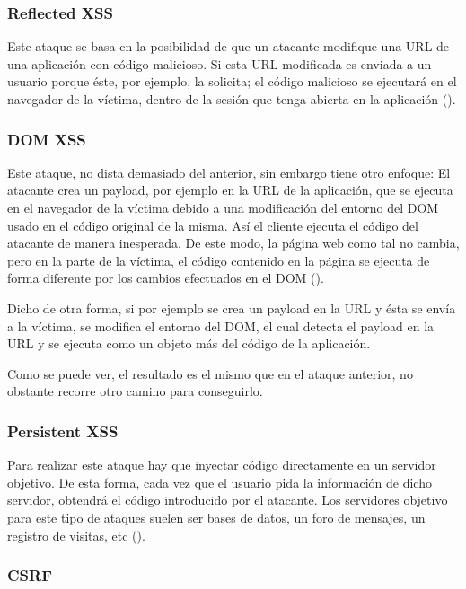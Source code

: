 \subsubsection{Reflected XSS}

Este ataque se basa en la posibilidad de que un atacante modifique una URL de una aplicación con código malicioso. Si esta URL modificada es enviada a un usuario porque éste, por ejemplo, la solicita; el código malicioso se ejecutará en el navegador de la víctima, dentro de la sesión que tenga abierta en la aplicación (\cite{reflected-xss}). %

\subsubsection{DOM XSS}

Este ataque, no dista demasiado del anterior, sin embargo tiene otro enfoque: El atacante crea un payload, por ejemplo en la URL de la aplicación, que se ejecuta en el navegador de la víctima debido a una modificación del entorno del DOM usado en el código original de la misma. Así el cliente ejecuta el código del atacante de manera inesperada. De este modo, la página web como tal no cambia, pero en la parte de la víctima, el código contenido en la página se ejecuta de forma diferente por los cambios efectuados en el DOM (\cite{dom-xss}).

Dicho de otra forma, si por ejemplo se crea un payload en la URL y ésta se envía a la víctima, se modifica el entorno del DOM, el cual detecta el payload en la URL y se ejecuta como un objeto más del código de la aplicación.

Como se puede ver, el resultado es el mismo que en el ataque anterior, no obstante recorre otro camino para conseguirlo. %

\subsubsection{Persistent XSS}

Para realizar este ataque hay que inyectar código directamente en un servidor objetivo. De esta forma, cada vez que el usuario pida la información de dicho servidor, obtendrá el código introducido por el atacante. Los servidores objetivo para este tipo de ataques suelen ser bases de datos, un foro de mensajes, un registro de visitas, etc (\cite{persistent-xss}). %

\subsubsection{CSRF}

